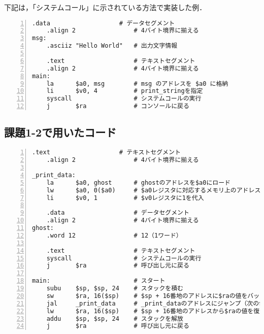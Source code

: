 下記は，「システムコール」に示されている方法で実装した例．
\begin{Verbatim}[numbers=left, xleftmargin=10mm, numbersep=6pt,
                    fontsize=\small, baselinestretch=0.8]
    .data                   # データセグメント
    .align 2                # 4バイト境界に揃える
msg:
    .asciiz "Hello World"   # 出力文字情報

    .text                   # テキストセグメント
    .align 2                # 4バイト境界に揃える
main:
    la      $a0, msg        # msg のアドレスを $a0 に格納
    li      $v0, 4          # print_stringを指定
    syscall                 # システムコールの実行
    j       $ra             # コンソールに戻る
\end{Verbatim}

\subsection{課題1-2で用いたコード} \label{sec:p1-2}
\begin{Verbatim}[numbers=left, xleftmargin=10mm, numbersep=6pt,
                    fontsize=\small, baselinestretch=0.8]
    .text                   # テキストセグメント
    .align 2                # 4バイト境界に揃える

_print_data:
    la      $a0, ghost      # ghostのアドレスを$a0にロード
    lw      $a0, 0($a0)     # $a0レジスタに対応するメモリ上のアドレスのワードを自身にロード
    li      $v0, 1          # $v0レジスタに1を代入

    .data                   # データセグメント
    .align 2                # 4バイト境界に揃える
ghost:
    .word 12                # 12（1ワード）

    .text                   # テキストセグメント
    syscall                 # システムコールの実行
    j       $ra             # 呼び出し元に戻る

main:                       # スタート
    subu    $sp, $sp, 24    # スタックを積む
    sw      $ra, 16($sp)    # $sp + 16番地のアドレスに$raの値をバックアップ
    jal     _print_data     # _print_dataのアドレスにジャンプ（次の命令のアドレスを$raに）
    lw      $ra, 16($sp)    # $sp + 16番地のアドレスから$raの値を復元
    addu    $sp, $sp, 24    # スタックを解放
    j       $ra             # 呼び出し元に戻る
\end{Verbatim}


